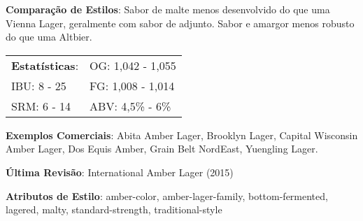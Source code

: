 \textbf{Comparação de Estilos}: Sabor de malte menos desenvolvido do que uma Vienna Lager, geralmente com sabor de adjunto. Sabor e amargor menos robusto do que uma Altbier.

\begin{tabular}{@{}p{35mm}p{35mm}@{}}
  \textbf{Estatísticas}: & OG: 1,042 - 1,055 \\
  IBU: 8 - 25 & FG: 1,008 - 1,014 \\
  SRM: 6 - 14 & ABV: 4,5\% - 6\%
\end{tabular}

\textbf{Exemplos Comerciais}: Abita Amber Lager, Brooklyn Lager, Capital Wisconsin Amber Lager, Dos Equis Amber, Grain Belt NordEast, Yuengling Lager.

\textbf{Última Revisão}: International Amber Lager (2015)

\textbf{Atributos de Estilo}: amber-color, amber-lager-family, bottom-fermented, lagered, malty, standard-strength, traditional-style